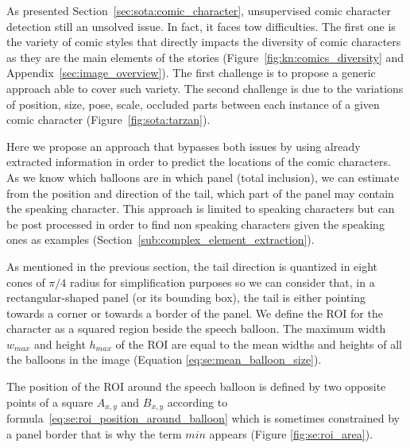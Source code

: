 As presented Section~\ref{sec:sota:comic_character}, unsupervised comic character detection still an unsolved issue.
In fact, it faces tow difficulties.
The first one is the variety of comic styles that directly impacts the diversity of comic characters as they are the main elements of the stories (Figure~\ref{fig:kn:comics_diversity} and Appendix~\ref{sec:image_overview}).
The first challenge is to propose a generic approach able to cover such variety.
The second challenge is due to the variations of position, size, pose, scale, occluded parts between each instance of a given comic character (Figure~\ref{fig:sota:tarzan}).

Here we propose an approach that bypasses both issues by using already extracted information in order to predict the locations of the comic characters.
As we know which balloons are in which panel (total inclusion), we can estimate from the position and direction of the tail, which part of the panel may contain the speaking character.
This approach is limited to speaking characters but can be post processed in order to find non speaking characters given the speaking ones as examples (Section~\ref{sub:complex_element_extraction}).

As mentioned in the previous section, the tail direction is quantized in eight cones of $\pi/4$ radius for simplification purposes so we can consider that, in a rectangular-shaped panel (or its bounding box), the tail is either pointing towards a corner or towards a border of the panel.
We define the ROI for the character as a squared region beside the speech balloon.
The maximum width $w_{max}$ and height $h_{max}$ of the ROI are equal to the mean widths and heights of all the balloons in the image (Equation \ref{eq:se:mean_balloon_size}).

The position of the ROI around the speech balloon is defined by two opposite points of a square $A_{x,y}$ and $B_{x,y}$ according to formula~\ref{eq:se:roi_position_around_balloon} which is sometimes constrained by a panel border that is why the term $min$ appears (Figure \ref{fig:se:roi_area}).


